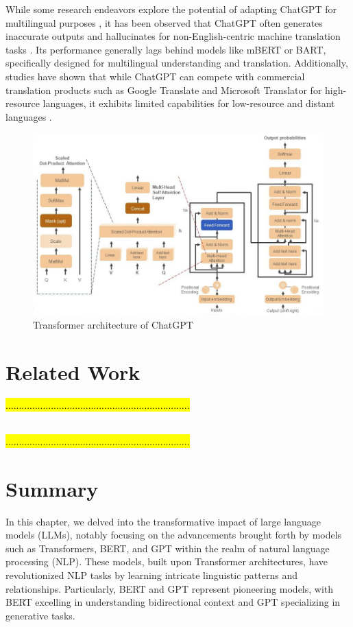While some research endeavors explore the potential of adapting ChatGPT for multilingual purposes \cite{brown20, lu23, peng23, pourkamali24}, it has been observed that ChatGPT often generates inaccurate outputs and hallucinates for non-English-centric machine translation tasks \cite{peng23}. 
Its performance generally lags behind models like mBERT or BART, specifically designed for multilingual understanding and translation. 
Additionally, studies have shown that while ChatGPT can compete with commercial translation products such as Google Translate and Microsoft Translator for high-resource languages, it exhibits limited capabilities for low-resource and distant languages \cite{peng23, hendy23, jiao23, pourkamali24}.
\begin{figure}
	\centering
	\includegraphics[width=1.0\linewidth]{Figures/ChatGPT-model}
	\caption{Transformer architecture of ChatGPT}
	\label{fig:chatgpt-model}
\end{figure}

\section{Related Work}
\hl{.....................................................................}

\cite{brown20}
\cite{lu23}
\cite{peng23}
\cite{hendy23}
\cite{jiao23}
\cite{pourkamali24}
\cite{jiang24}
\\
\hl{.....................................................................}

\section{Summary}
In this chapter, we delved into the transformative impact of large language models (LLMs), notably focusing on the advancements brought forth by models such as Transformers, BERT, and GPT within the realm of natural language processing (NLP). 
These models, built upon Transformer architectures, have revolutionized NLP tasks by learning intricate linguistic patterns and relationships. 
Particularly, BERT and GPT represent pioneering models, with BERT excelling in understanding bidirectional context and GPT specializing in generative tasks. 

